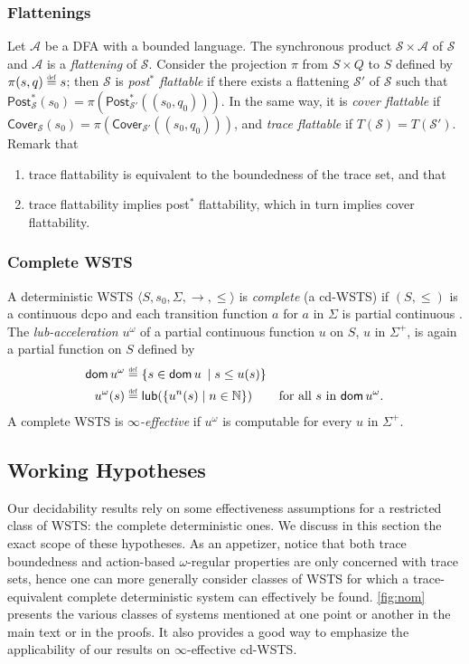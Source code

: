 \documentclass[11pt,reqno,a4paper]{amsart}
\newcommand{\eqdef}{\stackrel{\raisebox{-.15ex}{\scalebox{.5}{\upshape\textrm{def}}}}{=}}
\newcommand{\tup}[1]{\langle #1\rangle}
\newcommand{\dom}{\mathop{\mathsf{dom}}}
\renewcommand{\cite}{\citep}
\theoremstyle{plain}
\theoremstyle{definition}
\theoremstyle{remark}
\renewcommand{\paragraph}{\subsubsection*}
\begin{document}
\paragraph{Flattenings}
Let $\mathcal{A}$ be a DFA with a bounded language.  The synchronous
product $\mathcal{S}\times\mathcal{A}$ of $\mathcal{S}$ and
$\mathcal{A}$ is a \emph{flattening} of $\mathcal{S}$.  Consider the
projection $\pi$ from $S\times Q$ to $S$ defined by $\pi(s,q)\eqdef
s$; then $\mathcal{S}$ is \emph{post$^\ast$ flattable} if there exists
a flattening $\mathcal{S}'$ of $\mathcal{S}$ such that
$\mathsf{Post}^\ast_{\mathcal{S}}(s_0)=\pi(\mathsf{Post}^\ast_{\mathcal{S}'}((s_0,q_0)))$.
In the same way, it is \emph{cover flattable} if
$\mathsf{Cover}_{\mathcal{S}}(s_0)=\pi(\mathsf{Cover}_{\mathcal{S}'}((s_0,q_0)))$,
and \emph{trace flattable} if $T(\mathcal{S})=T(\mathcal{S}')$.
Remark that
\begin{enumerate}
\item trace flattability is equivalent to the boundedness of the trace
  set, and that
\item trace flattability implies post$^\ast$ flattability, which
in turn implies cover flattability.
\end{enumerate}

\paragraph{Complete WSTS}
A deterministic WSTS $\tup{S,s_0,\Sigma,{\rightarrow},{\leq}}$
is \emph{complete} (a cd-WSTS) if \mbox{$(S,\leq)$} is a continuous
dcpo and each transition function $a$ for $a$ in $\Sigma$ is partial continuous
\cite{cwsts1,cwsts2}.  The \emph{lub-acceleration} $u^\omega$ of
a partial continuous function $u$ on $S$, $u$ in $\Sigma^+$, is
again a partial function on $S$ defined by
\begin{align*}
\dom u^\omega&\eqdef\{s\in\dom u\:\mid s\leq u(s)\}\\
u^\omega(s)&\eqdef\mathsf{lub}(\{u^n(s)\mid
n\in\mathbb{N}\})&\text{for all $s$
  in $\dom u^\omega$.}
\end{align*}
A complete WSTS is \emph{$\infty$-effective} if
$u^\omega$ is computable for every $u$ in $\Sigma^+$.

\subsection{Working Hypotheses}\label{sub:hyp}
Our decidability results rely on some effectiveness assumptions for a
restricted class of WSTS: the complete deterministic ones.  We discuss
in this section the exact scope of these hypotheses.  As an appetizer,
notice that both trace boundedness and action-based $\omega$-regular
properties are only concerned with trace sets, hence one can more
generally consider classes of WSTS for which a trace-equivalent complete
deterministic system can effectively be found.  \autoref{fig:nom}
presents the various classes of systems mentioned at one point or
another in the main text or in the proofs.  It also provides a good
way to emphasize the applicability of our results on
$\infty$-effective cd-WSTS.
\end{document}
